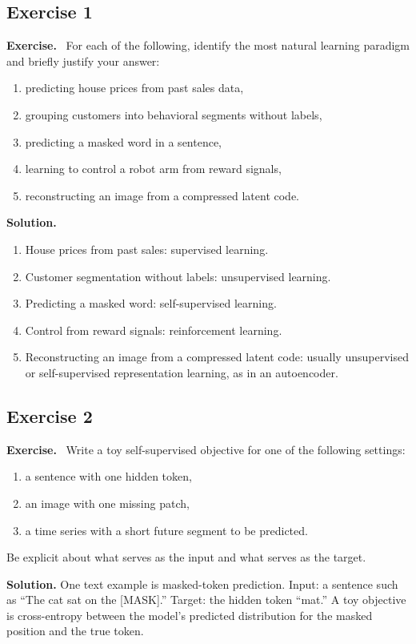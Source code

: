 \documentclass[11pt]{article}
\newenvironment{exercisebox}{\begin{framed}\noindent\textbf{Exercise.}\ }{\end{framed}}
\begin{document}
\subsection*{Exercise 1}
\begin{exercisebox}
For each of the following, identify the most natural learning paradigm and briefly justify your answer:
\begin{enumerate}
    \item predicting house prices from past sales data,
    \item grouping customers into behavioral segments without labels,
    \item predicting a masked word in a sentence,
    \item learning to control a robot arm from reward signals,
    \item reconstructing an image from a compressed latent code.
\end{enumerate}
\end{exercisebox}
\textbf{Solution.} \begin{enumerate}
\item House prices from past sales: supervised learning.
\item Customer segmentation without labels: unsupervised learning.
\item Predicting a masked word: self-supervised learning.
\item Control from reward signals: reinforcement learning.
\item Reconstructing an image from a compressed latent code: usually unsupervised or self-supervised representation learning, as in an autoencoder.
\end{enumerate}

\subsection*{Exercise 2}
\begin{exercisebox}
Write a toy self-supervised objective for one of the following settings:
\begin{enumerate}
    \item a sentence with one hidden token,
    \item an image with one missing patch,
    \item a time series with a short future segment to be predicted.
\end{enumerate}
Be explicit about what serves as the input and what serves as the target.
\end{exercisebox}
\textbf{Solution.} One text example is masked-token prediction. Input: a sentence such as ``The cat sat on the [MASK].'' Target: the hidden token ``mat.'' A toy objective is cross-entropy between the model's predicted distribution for the masked position and the true token.
\end{document}

